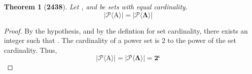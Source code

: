 \documentclass[preview]{standalone}
\newtheorem{theorem}{Theorem}
\begin{document}
\begin{theorem}[\textbf{2438}]
    Let , and \bm{$\Lambda$} be sets with equal cardinality. 
    \begin{equation*}
        \bm{
            \Big| 
                \mathcal{P}\big \langle \mathrm{A} \big \rangle 
            \Big| 
                = 
            \Big|
                \mathcal{P} \big \langle \Lambda \big \rangle 
            \Big|
        }
    \end{equation*}
\end{theorem}

\begin{proof}
    By the hypothesis, and by the defintion for set cardinality,
    there exists an integer \bm{$\iota$} such that 
    . 
    The cardinality of a power set is $2$ to the power of the set cardinality. 
    Thus,
    \begin{equation*}
        \bm{
            \big | \mathcal{P} \big \langle \mathrm{A} \big \rangle \big | 
                = 
            \big | \mathcal{P} \big \langle \Lambda \big \rangle \big | 
                = 
            2^{\iota}
        }        
    \end{equation*} 
\end{proof}
\end{document}

